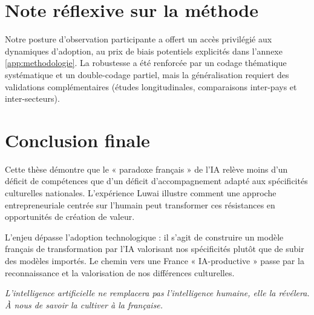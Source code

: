 \section{Note réflexive sur la méthode}
Notre posture d’observation participante a offert un accès privilégié aux dynamiques d’adoption, au prix de biais potentiels explicités dans l'annexe \ref{app:methodologie}. La robustesse a été renforcée par un codage thématique systématique et un double-codage partiel, mais la généralisation requiert des validations complémentaires (études longitudinales, comparaisons inter-pays et inter-secteurs).

\section{Conclusion finale}

Cette thèse démontre que le « paradoxe français » de l'IA relève moins d'un déficit de compétences que d'un déficit d'accompagnement adapté aux spécificités culturelles nationales. L'expérience Luwai illustre comment une approche entrepreneuriale centrée sur l'humain peut transformer ces résistances en opportunités de création de valeur.

L'enjeu dépasse l'adoption technologique : il s'agit de construire un modèle français de transformation par l'IA valorisant nos spécificités plutôt que de subir des modèles importés. Le chemin vers une France « IA-productive » passe par la reconnaissance et la valorisation de nos différences culturelles.

\emph{L'intelligence artificielle ne remplacera pas l'intelligence humaine, elle la révélera. À nous de savoir la cultiver à la française.}
